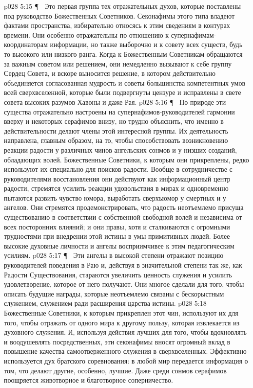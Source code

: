 \vs p028 5:15 \P\ \bibnobreakspace {} Это первая группа тех отражательных духов, которые поставлены под руководство Божественных Советников. Секонафимы этого типа владеют фактами пространства, избирательно относясь к этим сведениям в контурах времени. Они особенно отражательны по отношению к супернафимам\hyp{}координаторам информации, но также выборочно и к совету всех существ, будь то высокого или низкого ранга. Когда к Божественным Советникам обращаются за важным советом или решением, они немедленно вызывают к себе группу Сердец Совета, и вскоре выносится решение, в котором действительно объединяется согласованная мудрость и советы большинства компетентных умов всей сверхвселенной, которые были подвергнуты цензуре и исправлены в свете совета высоких разумов Хавоны и даже Рая.
\vs p028 5:16 \P\ \bibnobreakspace {} По природе эти существа отражательно настроены на супернафимов\hyp{}руководителей гармонии вверху и некоторых серафимов внизу, но трудно объяснить, что именно в действительности делают члены этой интересной группы. Их деятельность направлена, главным образом, на то, чтобы способствовать возникновению реакции радости у различных чинов ангельских сонмов и у низших созданий, обладающих волей. Божественные Советники, к которым они прикреплены, редко используют их специально для поисков радости. Вообще в сотрудничестве с руководителями восстановления они действуют как информационный центр радости, стремятся усилить реакции удовольствия в мирах и одновременно пытаются развить чувство юмора, выработать сверхъюмор у смертных и у ангелов. Они стремятся продемонстрировать, что радость неотъемлемо присуща существованию в соответствии с собственной свободной волей и независима от всех посторонних влияний; и они правы, хотя и сталкиваются с огромными трудностями при внедрении этой истины в умы примитивных людей. Более высокие духовные личности и ангелы восприимчивее к этим педагогическим усилиям.
\vs p028 5:17 \P\ \bibnobreakspace {} Эти ангелы в высокой степени отражают позицию руководителей поведения в Раю и, действуя в значительной степени так же, как Радости Существования, стараются увеличить ценность служения и усилить удовлетворение, которое от него получают. Они многое сделали для того, чтобы описать будущие награды, которые неотъемлемо связаны с бескорыстным служением, служением ради расширения царства истины.
\vs p028 5:18 Божественные Советники, к которым прикреплен этот чин, используют их для того, чтобы отражать от одного мира к другому пользу, которая извлекается из духовного служения. И, используя действия лучших для того, чтобы вдохновлять и воодушевлять посредственных, эти секонафимы вносят огромный вклад в повышение качества самоотверженного служения в сверхвселенных. Эффективно используется дух братского соревнования: в любой мир передается информация о том, что делают другие, особенно, лучшие. Даже среди сонмов серафимов поощряется животворное и благотворное соперничество.
